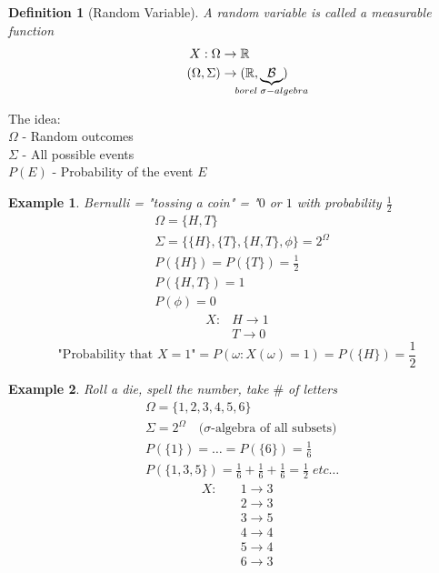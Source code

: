 \documentclass[12pt]{article}
\def\RR{\mathbb{R}}
\newtheorem{definition}{Definition}[section]
\newtheorem{example}{Example}[section]
\begin{document}
\begin{definition}[Random Variable] 
A random variable is called a measurable function
\begin{align*}
X:\Omega &\rightarrow \RR\\
(\Omega, \Sigma) &\rightarrow (\RR , \underbrace{\mathcal{B}}_{\mathclap{borel \; \sigma -algebra}})
\end{align*}
\end{definition}

The idea:\\
$\Omega$ - Random outcomes\\
$\Sigma$ - All possible events\\
$P(E)$ - Probability of the event $E$

\begin{example}
Bernulli = "tossing a coin" = "$0$ or $1$ with probability $\frac{1}{2}$
\begin{align*}
&\Omega = \{H,T\}\\
&\Sigma = \{ \{H\},\{T\}, \{H,T\}, \phi \} = 2^{\Omega}\\
&P(\{H\}) = P(\{T\}) = \frac{1}{2}\\
&P(\{H,T\}) = 1\\
&P(\phi) = 0
\end{align*}
\begin{align*}
X:&H\rightarrow 1\\
&T\rightarrow 0
\end{align*}
\[\text{"Probability that $X=1$"} = P(\omega :X(\omega)=1) = P(\{H\}) = \frac{1}{2}\]
\end{example}

\begin{example}
Roll a die, spell the number, take $\#$ of letters
\begin{align*}
&\Omega = \{1,2,3,4,5,6\}\\
&\Sigma = 2^{\Omega} \quad \text{($\sigma$-algebra of all subsets)}\\
&P(\{1\})= \dots =P(\{6\}) = \frac{1}{6}\\
&P(\{1,3,5\}) = \frac{1}{6}+\frac{1}{6}+\frac{1}{6}= \frac{1}{2} \; etc \dots
\end{align*}
\begin{align*}
X:\quad &1\rightarrow 3\\
&2\rightarrow 3\\
&3\rightarrow 5\\
&4\rightarrow 4\\
&5\rightarrow 4\\
&6\rightarrow 3
\end{align*}
\end{example}
\end{document}
